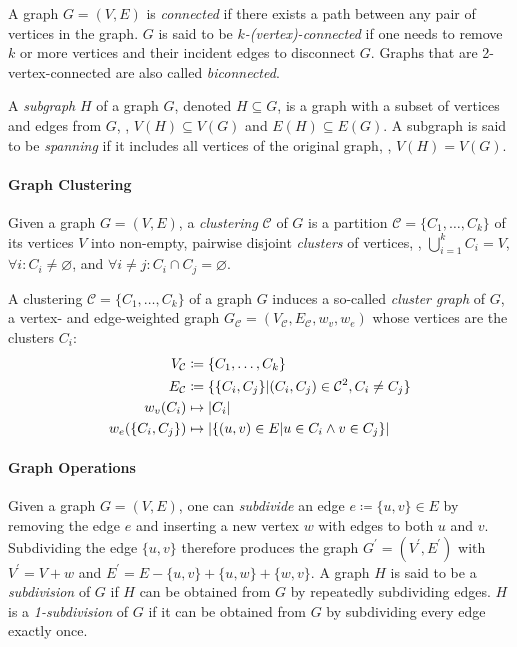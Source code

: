 A graph $G = (V, E)$ is \emph{connected} if there exists a path between any pair of vertices in the graph.
$G$ is said to be \emph{$k$-(vertex)-connected} if one needs to remove $k$ or more vertices and their incident edges to disconnect $G$.
Graphs that are 2-vertex-connected are also called \emph{biconnected}.

A \emph{subgraph} $H$ of a graph $G$, denoted $H \subseteq G$, is a graph with a subset of vertices and edges from $G$, \ie{}, $V(H) \subseteq V(G)$ and $E(H) \subseteq E(G)$.
A subgraph is said to be \emph{spanning} if it includes all vertices of the original graph, \ie{}, $V(H) = V(G)$.


\paragraph{Graph Clustering}

Given a graph $G = (V, E)$, a \emph{clustering} $\mathcal{C}$ of $G$ is a partition $\mathcal{C} = \{C_1, \dots, C_k\}$ of its vertices $V$ into non-empty, pairwise disjoint \emph{clusters} of vertices, \ie{}, $\bigcup_{i=1}^k C_i = V$, $\forall i \colon C_i \neq \varnothing$, and $\forall i \neq j \colon C_i \cap C_j = \varnothing$.

A clustering $\mathcal{C} = \{ C_1, \dots, C_k \}$ of a graph $G$ induces a so-called \emph{cluster graph} of $G$, a vertex- and edge-weighted graph $G_\mathcal{C} = (V_\mathcal{C}, E_\mathcal{C}, w_v, w_e)$ whose vertices are the clusters $C_i$:
%
\begin{align*}
V_\mathcal{C} &\coloneqq \{ C_1, \dots, C_k \} \\
E_\mathcal{C} &\coloneqq \{ \{C_i, C_j\} \vert (C_i, C_j) \in \mathcal{C}^2, C_i \neq C_j \} \\
w_v(C_i) &\mapsto \left\lvert C_i\right\rvert \\
w_e(\{C_i, C_j\}) &\mapsto \left\lvert\{ (u,v) \in E \vert u \in C_i \land v \in C_j \}\right\rvert
\end{align*}



\paragraph{Graph Operations}


Given a graph $G = (V, E)$, one can \emph{subdivide} an edge $e \coloneqq \{u,v\} \in E$ by removing the edge $e$ and inserting a new vertex $w$ with edges to both $u$ and $v$.
Subdividing the edge $\{u,v\}$ therefore produces the graph $G^\prime = (V^\prime, E^\prime)$ with $V^\prime = V + w$ and $E^\prime = E - \{u,v\} + \{u,w\} + \{w,v\}$.
A graph $H$ is said to be a \emph{subdivision} of $G$ if $H$ can be obtained from $G$ by repeatedly subdividing edges.
$H$ is a \emph{1-subdivision} of $G$ if it can be obtained from $G$ by subdividing every edge exactly once.


